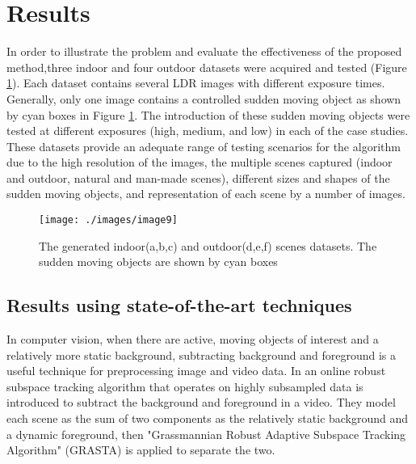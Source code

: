 \documentclass[preprint,12pt,3p]{elsarticle}
\begin{document}
\section{Results}
\label{sec4}

In order to illustrate the problem and evaluate the effectiveness of the proposed method,three indoor and four outdoor datasets were acquired and tested (Figure \ref{fig:image9}). Each dataset contains several LDR images with different exposure times. Generally, only one image contains a controlled sudden moving object as shown by cyan boxes in Figure \ref{fig:image9}.  The introduction of these sudden moving objects were tested at different exposures (high, medium, and low) in each of the case studies.
These datasets provide an adequate range of testing scenarios for the algorithm due to the high resolution of the images, the multiple scenes captured (indoor and outdoor, natural and man-made scenes), different sizes and shapes of the sudden moving objects, and representation of each scene by a number of images.

\begin{figure}[h]
\centering
\texttt{[image: ./images/image9]}
\caption{The generated indoor(a,b,c) and outdoor(d,e,f) scenes datasets. The sudden moving objects are shown by cyan boxes}
\label{fig:image9}
\end{figure}

\subsection{Results using state-of-the-art techniques}

In computer vision, when there are active, moving objects of interest and a relatively more static background, subtracting background and foreground is a useful technique for preprocessing image and video data. In \cite{26} an online robust subspace tracking algorithm that operates on highly subsampled data is introduced to subtract the background and foreground in a video. They model each scene as the sum of two components as the relatively static background and a dynamic foreground, then "Grassmannian Robust Adaptive Subspace Tracking Algorithm" (GRASTA) is applied to separate the two.
\end{document}
